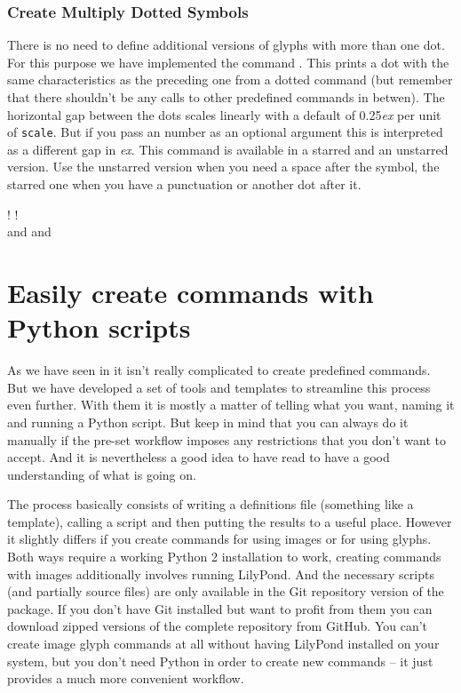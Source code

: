 \documentclass{article}
\begin{document}
\subsubsection{Create Multiply Dotted Symbols}
\label{subsubsec:multiply_dotted_symbols}

There is no need to define additional versions of glyphs with more than one dot.
For this purpose we have implemented the command .
This prints a dot with the same characteristics as the preceding one from a dotted command (but remember that there shouldn't be any calls to other predefined commands in betwen).
The horizontal gap between the dots scales linearly with a default of 0.25\emph{ex} per unit of \texttt{scale}.
But if you pass an number as an optional argument this is interpreted as a different gap in \emph{ex}.
This command is available in a starred and an unstarred version.
Use the unstarred version when you need a space after the symbol, the starred one when you have a punctuation or another dot after it.

\noindent {}! 
\halfNoteRestDotted*\lilyPrintMoreDots*!\\
 and 
\halfNoteRestDotted*[scale=1.5]\lilyPrintMoreDots and 


\section{Easily create commands with Python scripts}
\label{sec:python_scripts}
As we have seen in  it isn't really complicated to create predefined commands.
But we have developed a set of tools and templates to streamline this process even further.
With them it is mostly a matter of telling what you want, naming it and running a Python script.
But keep in mind that you can always do it manually if the pre-set workflow imposes any restrictions that you don't want to accept.
And it is nevertheless a good idea to have read  to have a good understanding of what is going on.

The process basically consists of writing a definitions file (something like a template), calling a script and then putting the results to a useful place.
However it slightly differs if you create commands for using images or for using \emmentaler glyphs.
Both ways require a working Python 2 installation to work, creating commands with images additionally involves running LilyPond.
And the necessary scripts (and partially source files) are only available in the Git repository version of the package.
If you don't have Git installed but want to profit from them you can download zipped versions of the complete repository from GitHub.
You can't create image glyph commands at all without having LilyPond installed on your system, but you don't need Python in order to create new commands -- it just provides a much more convenient workflow.
\end{document}

